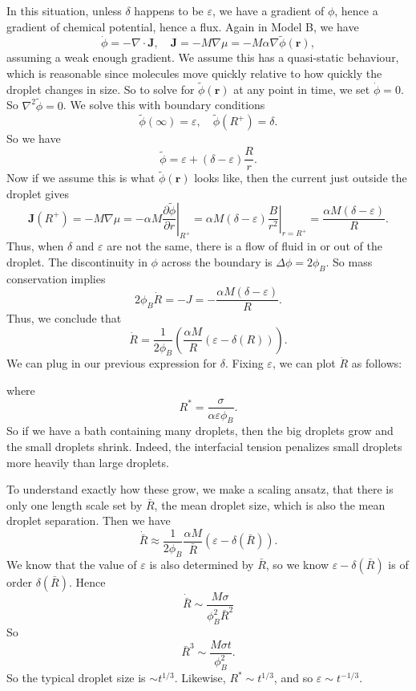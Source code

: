 \documentclass[a4paper]{article}
\begin{document}
In this situation, unless $\delta$ happens to be $\varepsilon$, we have a gradient of $\phi$, hence a gradient of chemical potential, hence a flux. Again in Model B, we have
\[
  \dot{\phi} = - \nabla \cdot \mathbf{J},\quad \mathbf{J} = -M \nabla \mu = -M \alpha \nabla \tilde{\phi}(\mathbf{r}),
\]
assuming a weak enough gradient. We assume this has a quasi-static behaviour, which is reasonable since molecules move quickly relative to how quickly the droplet changes in size. So to solve for $\tilde{\phi}(\mathbf{r})$ at any point in time, we set $\dot{\phi} = 0$. So $\nabla^2 \tilde{\phi} = 0$. We solve this with boundary conditions
\[
  \tilde{\phi}(\infty) = \varepsilon,\quad \tilde{\phi}(R^+) = \delta.
\]
So we have
\[
  \tilde{\phi} = \varepsilon + (\delta - \varepsilon) \frac{R}{r}.
\]
Now if we assume this is what $\tilde{\phi}(\mathbf{r})$ looks like, then the current just outside the droplet gives
\[
  \mathbf{J}(R^+) = -M \nabla \mu = - \alpha M \left.\frac{\partial \tilde{\phi}}{\partial r}\right|_{R^+} = \alpha M(\delta - \varepsilon) \left.\frac{B}{r^2}\right|_{r = R^+} = \frac{\alpha M(\delta - \varepsilon)}{R}.
\]
Thus, when $\delta$ and $\varepsilon$ are not the same, there is a flow of fluid in or out of the droplet. The discontinuity in $\phi$ across the boundary is $\Delta \phi = 2 \phi_B$. So mass conservation implies
\[
  2 \phi_B \dot{R} = - J = - \frac{\alpha M (\delta - \varepsilon)}{R}.
\]
Thus, we conclude that
\[
  \dot{R} = \frac{1}{2 \phi_B} \left(\frac{\alpha M}{R} (\varepsilon - \delta(R))\right).
\]
We can plug in our previous expression for $\delta$. Fixing $\varepsilon$, we can plot $\dot{R}$ as follows:
\begin{center}
\end{center}
where
\[
  R^* = \frac{\sigma}{\alpha \varepsilon \phi_B}.
\]
So if we have a bath containing many droplets, then the big droplets grow and the small droplets shrink. Indeed, the interfacial tension penalizes small droplets more heavily than large droplets.

To understand exactly how these grow, we make a scaling ansatz, that there is only one length scale set by $\bar{R}$, the mean droplet size, which is also the mean droplet separation. Then we have
\[
  \dot{\bar{R}} \approx \frac{1}{2\phi_B} \frac{\alpha M}{\bar{R}} (\varepsilon - \delta(\bar{R})).
\]
We know that the value of $\varepsilon$ is also determined by $\bar{R}$, so we know $\varepsilon - \delta (\bar{R})$ is of order $\delta (\bar{R})$. Hence
\[
  \dot{\bar{R}} \sim \frac{M\sigma}{\phi_B^2 \bar{R}^2}
\]
So
\[
  \bar{R}^3 \sim \frac{M\sigma t}{\phi_B^2}.
\]
So the typical droplet size is $\sim t^{1/3}$. Likewise, $R^* \sim t^{1/3}$, and so $\varepsilon \sim t^{-1/3}$.
\end{document}
